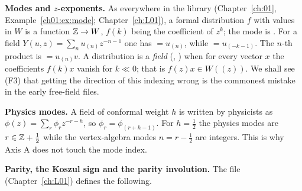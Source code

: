 \textbf{Modes and $z$-exponents.} As everywhere in the library (Chapter~\ref{ch:01},
Example~\ref{ch01:ex:mode}; Chapter~\ref{ch:L01}), a formal distribution $f$ with values in $W$ is a
function ${\mathbb{Z}}\to W$, $f(k)$ being the coefficient of $z^k$; the mode is
. For a field $Y(u,z)=\sum_nu_{(n)}z^{-n-1}$ one has
 $=u_{(n)}$, while  $=u_{(-k-1)}$. The $n$-th product is
 $=u_{(n)}v$. A distribution is a \emph{field}
(, ) when for every vector $x$ the coefficients
$f(k)x$ vanish for $k\ll0$; that is $f(z)x\in W((z))$. We shall see (F3) that getting the
direction of this indexing wrong is the commonest mistake in the early free-field files.

\textbf{Physics modes.} A field of conformal weight $h$ is written by physicists as
$\phi(z)=\sum_r\phi_rz^{-r-h}$, so $\phi_r=\phi_{(r+h-1)}$. For $h=\tfrac12$ the physics modes are
$r\in{\mathbb{Z}}+\tfrac12$ while the vertex-algebra modes $n=r-\tfrac12$ are integers. This is why Axis A
does not touch the mode index.

\textbf{Parity, the Koszul sign and the parity involution.} The file
 (Chapter~\ref{ch:L01}) defines the following.

